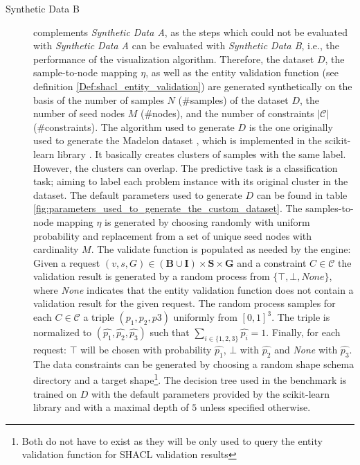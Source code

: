 \begin{description}
    \item[Synthetic Data B] complements \textit{Synthetic Data A}, as the steps which could not be evaluated with \textit{Synthetic Data A} can be evaluated with \textit{Synthetic Data B}, i.e., the performance of the visualization algorithm. Therefore, the dataset $D$, the sample-to-node mapping $\eta$, as well as the entity validation function (see definition \ref{Def:shacl_entity_validation}) are generated synthetically on the basis of the number of samples $N$ (\#samples) of the dataset $D$, the number of seed nodes $M$ (\#nodes), and the number of constraints $|\mathcal{C}|$ (\#constraints). The algorithm used to generate $D$ is the one originally used to generate the \glqq Madelon\grqq{} dataset \cite{guyon2004result}, which is implemented in the scikit-learn library \cite{sklearn_api}. It basically creates clusters of samples with the same label. However, the clusters can overlap. The predictive task is a classification task; aiming to label each problem instance with its original cluster in the dataset. The default parameters used to generate $D$ can be found in table \ref{fig:parameters_used_to_generate_the_custom_dataset}. The samples-to-node mapping $\eta$ is generated by choosing randomly with uniform probability and replacement from a set of unique seed nodes with cardinality $M$. The validate function is populated as needed by the engine: Given a request $(v, s, G) \in (\mathbf{B} \cup \mathbf{I}) \times \mathbf{S} \times \mathbf{G}$ and a constraint $C \in \mathcal{C}$ the validation result is generated by a random process from $\{\top, \bot, \textit{None}\}$, where \textit{None} indicates that the entity validation function does not contain a validation result for the given request. The random process samples for each $C \in \mathcal{C}$ a triple $(p_1, p_2, p3)$ uniformly from $[0,1]^3$. The triple is normalized to $(\hat{p_1}, \hat{p_2}, \hat{p_3})$ such that $\sum_{i \in \{1,2,3\}} \hat{p_i} = 1$. Finally, for each request: $\top$ will be chosen with probability $\hat{p_1}$, $\bot$ with $\hat{p_2}$ and \textit{None} with $\hat{p_3}$.
    The data constraints can be generated by choosing a random shape schema directory and a target shape\footnote{Both do not have to exist as they will be only used to query the entity validation function for SHACL validation results}.
    The decision tree used in the benchmark is trained on $D$ with the default parameters provided by the scikit-learn library and with a maximal depth of $5$ unless specified otherwise. 
        

\end{description}
